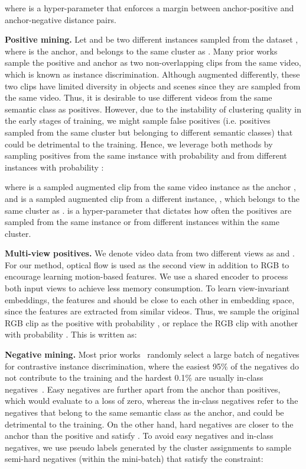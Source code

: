 \documentclass[10pt,twocolumn,letterpaper]{article}
\begin{document}
\noindent where  is a hyper-parameter that enforces a margin between anchor-positive and anchor-negative distance pairs. 

\textbf{Positive mining.} Let  and  be two different instances sampled from the dataset , where  is the anchor, and  belongs to the same cluster as . Many prior works \cite{qian2021spatiotemporal, dave2021tclr, iic} sample the positive and anchor as two non-overlapping clips from the same video, which is known as instance discrimination. Although augmented differently, these two clips have limited diversity in objects and scenes since they are sampled from the same video. Thus, it is desirable to use different videos from the same semantic class as positives. However, due to the instability of clustering quality in the early stages of training, we might sample false positives (i.e. positives sampled from the same cluster but belonging to different semantic classes) that could be detrimental to the training. Hence, we leverage both methods by sampling positives from the same instance with probability  and from different instances with probability :

where  is a sampled augmented clip from the same video instance as the anchor , and  is a sampled augmented clip from a different instance, , which belongs to the same cluster as .  is a hyper-parameter that dictates how often the positives are sampled from the same instance or from different instances within the same cluster.

\textbf{Multi-view positives.} We denote video data from two different views as  and . For our method, optical flow is used as the second view in addition to RGB to encourage learning motion-based features. We use a shared encoder to process both input views to achieve less memory consumption. To learn view-invariant embeddings, the features  and  should be close to each other in embedding space, since the features are extracted from similar videos. Thus, we sample the original RGB clip  as the positive with probability , or replace the RGB clip with another  with probability . This is written as:
\vspace*{-0.2cm}



\textbf{Negative mining.} Most prior works~\cite{coclr, dave2021tclr, qian2021spatiotemporal, iic} randomly select a large batch of negatives for contrastive instance discrimination, where the easiest 95\% of the negatives do not contribute to the training and the hardest 0.1\% are usually in-class negatives~\cite{cai2020negatives}. Easy negatives are further apart from the anchor than positives, which would evaluate to a loss of zero, whereas the in-class negatives refer to the negatives that belong to the same semantic class as the anchor, and could be detrimental to the training. On the other hand, hard negatives are closer to the anchor than the positive and satisfy . To avoid easy negatives and in-class negatives, we use pseudo labels generated by the cluster assignments to sample semi-hard negatives (within the mini-batch) that satisfy the constraint:
\end{document}
